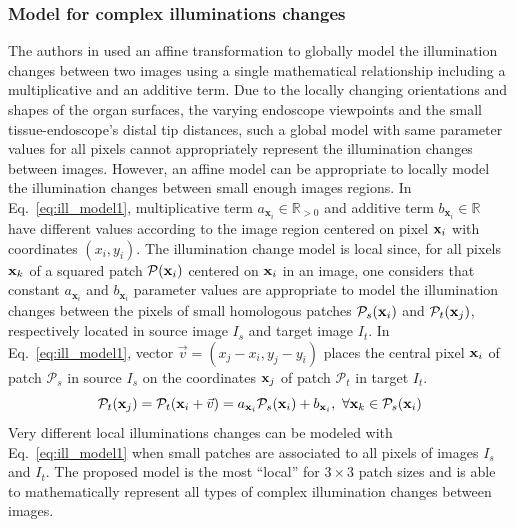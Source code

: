 \documentclass[a4paper,fleqn]{cas-dc}
\begin{document}
\subsubsection{Model for complex illuminations changes \label{sec:illumination_change_models}}
The authors in \citep{Ozyoruk_MIA_2021} used an affine transformation to globally model the illumination changes between two images using a single mathematical relationship including a multiplicative and an additive term. Due to the locally changing orientations and shapes of the organ surfaces, the varying endoscope viewpoints and the small tissue-endoscope's distal tip distances, such a global model with same parameter values for all pixels cannot appropriately represent the illumination changes between images. However, an affine model can be appropriate to locally model the illumination changes between small enough images regions. In Eq.~\eqref{eq:ill_model1}, multiplicative term $a_{\mathbf{x}_i} \in \mathbb{R}_{>0}$ and additive term $b_{\mathbf{x}_i} \in \mathbb{R}$ have different values according to the image region centered on pixel ${\bf x}_i$ with coordinates $(x_i, y_i)$. The illumination change model is local since, for all pixels ${\bf x}_k$ of a squared patch $\mathcal{P}({\bf x}_i)$ centered on ${\bf x}_i$ in an image, one considers that constant $a_{\mathbf{x}_i}$ and $b_{\mathbf{x}_i}$ parameter values are appropriate to model the illumination changes between the pixels of small homologous patches $\mathcal{P}_s({\bf x}_i)$ and $\mathcal{P}_t({\bf x}_j)$, respectively located in source image $I_s$ and target image $I_t$. In Eq.~\eqref{eq:ill_model1}, vector $\vec{v}=(x_j-x_i, y_j-y_i)$ places the central pixel ${\bf x}_i$ of patch $\mathcal{P}_s$ in source $I_s$ on the coordinates ${\bf x}_j$ of patch $\mathcal{P}_t$ in target $I_t$.
%
\begin{equation} \label{eq:ill_model1}
\mathcal{P}_t({\bf x}_j) = \mathcal{P}_t({\bf x}_i + \vec{v}) = a_{\mathbf{x}_i} \mathcal{P}_s({\bf x}_i) + b_{\mathbf{x}_i},  \, \, \forall {\bf x}_k \in \mathcal{P}_s({\bf x}_i) 
\end{equation}
%
Very different local illuminations changes can be modeled with Eq.~\eqref{eq:ill_model1} when small patches are associated to all pixels of images $I_s$ and  $I_t$. The proposed model is the most ``local'' for $3 \times 3$ patch sizes and is able to mathematically represent all types of complex illumination changes between images.   
%
\end{document}
